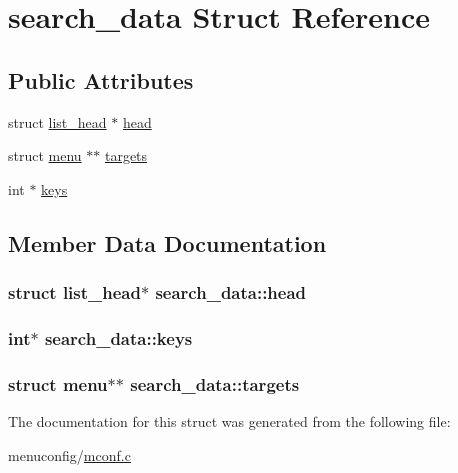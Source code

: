 \hypertarget{structsearch__data}{\section{search\-\_\-data Struct Reference}
\label{structsearch__data}
}
\subsection*{Public Attributes}
\begin{DoxyCompactItemize}
\item 
struct \hyperlink{structlist__head}{list\-\_\-head} $\ast$ \hyperlink{structsearch__data_aeb35bfe8c119292b2bd136fa87c6cff1}{head}
\item 
struct \hyperlink{structmenu}{menu} $\ast$$\ast$ \hyperlink{structsearch__data_a5778a00ba5c0211a7f8c7c64182cb118}{targets}
\item 
int $\ast$ \hyperlink{structsearch__data_ae02c7e03d92b365341647ae3e80a0b41}{keys}
\end{DoxyCompactItemize}


\subsection{Member Data Documentation}
\hypertarget{structsearch__data_aeb35bfe8c119292b2bd136fa87c6cff1}{
\subsubsection[{head}]{\setlength{\rightskip}{0pt plus 5cm}struct {\bf list\-\_\-head}$\ast$ search\-\_\-data\-::head}}\label{structsearch__data_aeb35bfe8c119292b2bd136fa87c6cff1}
\hypertarget{structsearch__data_ae02c7e03d92b365341647ae3e80a0b41}{
\subsubsection[{keys}]{\setlength{\rightskip}{0pt plus 5cm}int$\ast$ search\-\_\-data\-::keys}}\label{structsearch__data_ae02c7e03d92b365341647ae3e80a0b41}
\hypertarget{structsearch__data_a5778a00ba5c0211a7f8c7c64182cb118}{
\subsubsection[{targets}]{\setlength{\rightskip}{0pt plus 5cm}struct {\bf menu}$\ast$$\ast$ search\-\_\-data\-::targets}}\label{structsearch__data_a5778a00ba5c0211a7f8c7c64182cb118}


The documentation for this struct was generated from the following file\-:\begin{DoxyCompactItemize}
\item 
menuconfig/\hyperlink{mconf_8c}{mconf.\-c}\end{DoxyCompactItemize}
